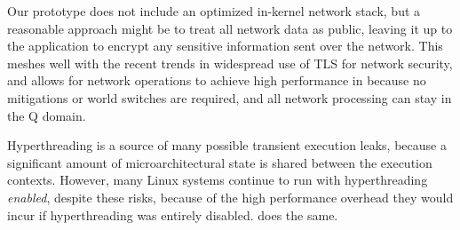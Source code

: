 Our \sys prototype does not include an optimized in-kernel network stack, but a
reasonable approach might be to treat all network data as public, leaving
it up to the application to encrypt any sensitive information sent over
the network.  This meshes well with the recent trends in widespread use
of TLS for network security, and allows for network operations to achieve
high performance in \sys because no mitigations or world switches are
required, and all network processing can stay in the Q domain.

Hyperthreading is a source of many possible transient execution leaks,
because a significant amount of microarchitectural state is shared
between the execution contexts.  However, many Linux systems continue
to run with hyperthreading \emph{enabled}, despite these risks, because
of the high performance overhead they would incur if hyperthreading was
entirely disabled.  \sys does the same.
